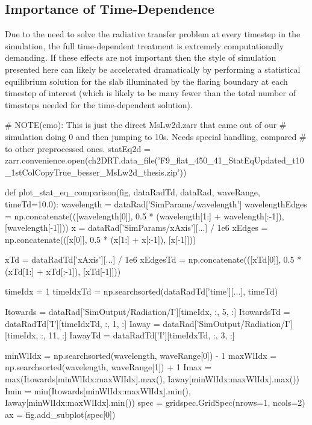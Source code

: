 \subsection{Importance of Time-Dependence}\label{Sec:2dTimeDepSE}

Due to the need to solve the radiative transfer problem at every timestep in the \Radyn{} simulation, the full time-dependent treatment is extremely computationally demanding.
If these effects are not important then the style of simulation presented here can likely be accelerated dramatically by performing a statistical equilibrium solution for the slab illuminated by the flaring boundary at each timestep of interest (which is likely to be many fewer than the total number of timesteps needed for the time-dependent solution).

\begin{pycode}[2DRT]
# NOTE(cmo): This is just the direct MsLw2d.zarr that came out of our
# simulation doing 0 and then jumping to 10s. Needs special handling, compared
# to other preprocessed ones.
statEq2d = zarr.convenience.open(ch2DRT.data_file('F9_flat_450_41_StatEqUpdated_t10_1stColCopyTrue_besser_MsLw2d_thesis.zip'))

def plot_stat_eq_comparison(fig, dataRadTd, dataRad, waveRange, timeTd=10.0):
    wavelength = dataRad['SimParams/wavelength']
    wavelengthEdges = np.concatenate(([wavelength[0]], 0.5 * (wavelength[1:] + wavelength[:-1]), [wavelength[-1]]))
    x = dataRad['SimParams/xAxis'][...] / 1e6
    xEdges = np.concatenate(([x[0]], 0.5 * (x[1:] + x[:-1]), [x[-1]]))

    xTd = dataRadTd['xAxis'][...] / 1e6
    xEdgesTd = np.concatenate(([xTd[0]], 0.5 * (xTd[1:] + xTd[:-1]), [xTd[-1]]))

    timeIdx = 1
    timeIdxTd = np.searchsorted(dataRadTd['time'][...], timeTd)

    Itowards = dataRad['SimOutput/Radiation/I'][timeIdx, :, 5, :]
    ItowardsTd = dataRadTd['I'][timeIdxTd, :, 1, :]
    Iaway = dataRad['SimOutput/Radiation/I'][timeIdx, :, 11, :]
    IawayTd = dataRadTd['I'][timeIdxTd, :, 3, :]

    minWlIdx = np.searchsorted(wavelength, waveRange[0]) - 1
    maxWlIdx = np.searchsorted(wavelength, waveRange[1]) + 1
    Imax = max(Itowards[minWlIdx:maxWlIdx].max(), Iaway[minWlIdx:maxWlIdx].max())
    Imin = min(Itowards[minWlIdx:maxWlIdx].min(), Iaway[minWlIdx:maxWlIdx].min())
    spec = gridspec.GridSpec(nrows=1, ncols=2)
    ax = fig.add_subplot(spec[0])


\end{pycode}
